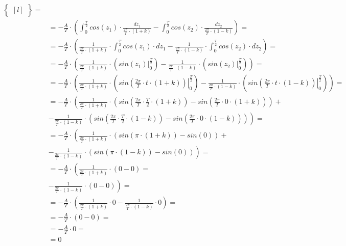 \begin{task}
\begin{align*}
\begin{Bmatrix*}[l]
\end{Bmatrix*}=\\
&=-\frac{A}{T} \cdot \left(\int_{0}^{\frac{T}{2}} cos\left( z_1 \right)\cdot \frac{dz_1}{\frac{2\pi}{T} \cdot \left(1+k\right)}  - \int_{0}^{\frac{T}{2}} cos\left( z_2\right) \cdot \frac{dz_2}{\frac{2\pi}{T} \cdot \left(1-k\right)}\right)=\\
&=-\frac{A}{T} \cdot \left(\frac{1}{\frac{2\pi}{T}\cdot \left(1+k\right)} \cdot \int_{0}^{\frac{T}{2}} cos\left( z_1 \right)\cdot dz_1 - \frac{1}{\frac{2\pi}{T} \cdot \left(1-k\right)} \cdot \int_{0}^{\frac{T}{2}} cos\left( z_2\right) \cdot dz_2 \right)=\\
&=-\frac{A}{T} \cdot \left(\frac{1}{\frac{2\pi}{T}\cdot \left(1+k\right)} \cdot \left( \left. sin\left( z_1 \right) \right|_{0}^{\frac{T}{2}} \right) - \frac{1}{\frac{2\pi}{T} \cdot \left(1-k\right)} \cdot \left(\left. sin\left( z_2\right) \right|_{0}^{\frac{T}{2}} \right) \right)=\\
&=-\frac{A}{T} \cdot \left(\frac{1}{\frac{2\pi}{T}\cdot \left(1+k\right)} \cdot \left( \left. sin\left( \frac{2\pi}{T} \cdot t \cdot \left(1+k\right) \right) \right|_{0}^{\frac{T}{2}} \right) - \frac{1}{\frac{2\pi}{T} \cdot \left(1-k\right)} \cdot \left(\left. sin\left( \frac{2\pi}{T} \cdot t \cdot \left(1-k\right)\right) \right|_{0}^{\frac{T}{2}} \right) \right)=\\
&=-\frac{A}{T} \cdot \left(\frac{1}{\frac{2\pi}{T}\cdot \left(1+k\right)} \cdot \left( sin\left( \frac{2\pi}{T} \cdot \frac{T}{2} \cdot \left(1+k\right) \right) - sin\left( \frac{2\pi}{T} \cdot 0 \cdot \left(1+k\right) \right) \right) \right.+\\
&\left.- \frac{1}{\frac{2\pi}{T} \cdot \left(1-k\right)} \cdot \left( sin\left( \frac{2\pi}{T} \cdot \frac{T}{2} \cdot \left(1-k\right)\right) -  sin\left( \frac{2\pi}{T} \cdot 0 \cdot \left(1-k\right)\right) \right) \right)=\\
&=-\frac{A}{T} \cdot \left(\frac{1}{\frac{2\pi}{T}\cdot \left(1+k\right)} \cdot \left( sin\left(\pi \cdot \left(1+k\right) \right) - sin\left( 0 \right) \right) \right.+\\
&\left.- \frac{1}{\frac{2\pi}{T} \cdot \left(1-k\right)} \cdot \left( sin\left(\pi \cdot \left(1-k\right)\right) -  sin\left( 0 \right) \right) \right)=\\
&=-\frac{A}{T} \cdot \left(\frac{1}{\frac{2\pi}{T}\cdot \left(1+k\right)} \cdot \left( 0 - 0 \right) \right.=\\
&\left.- \frac{1}{\frac{2\pi}{T} \cdot \left(1-k\right)} \cdot \left( 0 -  0 \right) \right)=\\
&=-\frac{A}{T} \cdot \left(\frac{1}{\frac{2\pi}{T}\cdot \left(1+k\right)} \cdot 0 - \frac{1}{\frac{2\pi}{T} \cdot \left(1-k\right)} \cdot 0 \right)=\\
&=-\frac{A}{T} \cdot \left(0 - 0 \right)=\\
&=-\frac{A}{T} \cdot 0=\\
&=0
\end{align*}


\end{task}
